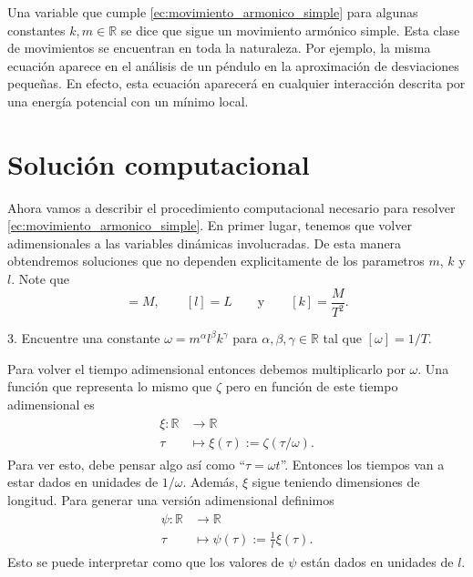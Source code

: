 \documentclass{article}
\begin{document}
Una variable que cumple \eqref{ec:movimiento_armonico_simple} para algunas constantes $k,m\in\mathbb{R}$ se dice que sigue un movimiento armónico simple. Esta clase de movimientos se encuentran en toda la naturaleza. Por ejemplo, la misma ecuación aparece en el análisis de un péndulo en la aproximación de desviaciones pequeñas. En efecto, esta ecuación aparecerá en cualquier interacción descrita por una energía potencial con un mínimo local.

\section{Solución computacional}

Ahora vamos a describir el procedimiento computacional necesario para resolver \eqref{ec:movimiento_armonico_simple}. En primer lugar, tenemos que volver adimensionales a las variables dinámicas involucradas. De esta manera obtendremos soluciones que no dependen explicitamente de los parametros $m$, $k$ y $l$. Note que
\begin{equation}
[m]=M,\qquad [l]=L\qquad\text{y}\qquad [k]=\frac{M}{T^2}.
\end{equation}

3. Encuentre una constante $\omega=m^\alpha l^\beta k^\gamma$ para $\alpha,\beta,\gamma\in\mathbb{R}$ tal que $[\omega]=1/T$.

Para volver el tiempo adimensional entonces debemos multiplicarlo por $\omega$. Una función que representa lo mismo que $\zeta$ pero en función de este tiempo adimensional es
\begin{align}
\begin{split}
\xi:\mathbb{R}&\rightarrow\mathbb{R}\\
\tau&\mapsto \xi(\tau):=\zeta(\tau/\omega).
\end{split}
\end{align}
Para ver esto, debe pensar algo así como ``$\tau=\omega t$''. Entonces los tiempos van a estar dados en unidades de $1/\omega$. Además, $\xi$ sigue teniendo dimensiones de longitud. Para generar una versión adimensional definimos
\begin{align}
\begin{split}
\psi:\mathbb{R}&\rightarrow\mathbb{R}\\
\tau&\mapsto\psi(\tau):=\frac{1}{l}\xi(\tau).
\end{split}
\end{align}
Esto se puede interpretar como que los valores de $\psi$ están dados en unidades de $l$.
\end{document}
